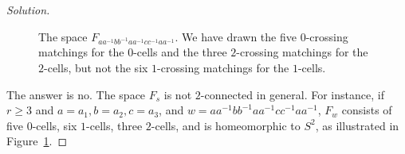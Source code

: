 \documentclass{amsart}
\begin{document}
\begin{proof}[Solution]
\begin{figure}[h]
\begin{tikzpicture}[xscale=4,yscale=-2.5]
    \end{tikzpicture}
    \caption{The space $F_{aa^{-1}bb^{-1}aa^{-1}cc^{-1}aa^{-1}}$. We
      have drawn the five $0$-crossing matchings for the $0$-cells and
      the three $2$-crossing matchings for the $2$-cells, but not the
      six $1$-crossing matchings for the
      $1$-cells.}\label{fig:menorah}
  \end{figure}

  
  The answer is no. The space $F_s$ is not $2$-connected in general. For instance, if $r\geq 3$ and $a=a_1,b=a_2,c=a_3$, and $w=aa^{-1}bb^{-1}aa^{-1}cc^{-1}aa^{-1}$, $F_w$ consists of five $0$-cells, six $1$-cells, three $2$-cells,
  and is homeomorphic to $S^2$, as illustrated in Figure~\ref{fig:menorah}.
\end{proof}
\end{document}
